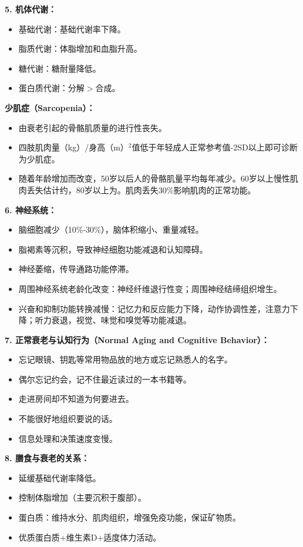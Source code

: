 \begin{defbox}
\textbf{5. 机体代谢：}
\begin{itemize}[leftmargin=*]
    \item 基础代谢：基础代谢率下降。
    \item 脂质代谢：体脂增加和血脂升高。
    \item 糖代谢：糖耐量降低。
    \item 蛋白质代谢：分解$>$合成。
\end{itemize}

\textbf{少肌症（Sarcopenia）：}
\begin{itemize}[leftmargin=*]
    \item 由衰老引起的骨骼肌质量的进行性丧失。
    \item 四肢肌肉量（kg）/身高（m）$^2$值低于年轻成人正常参考值-2SD以上即可诊断为少肌症。
    \item 随着年龄增加而改变，50岁以后人的骨骼肌量平均每年减少。60岁以上慢性肌肉丢失估计约，80岁以上为。肌肉丢失30\%影响肌肉的正常功能。
\end{itemize}

\textbf{6. 神经系统：}
\begin{itemize}[leftmargin=*]
    \item 脑细胞减少（10\%-30\%），脑体积缩小、重量减轻。
    \item 脂褐素等沉积，导致神经细胞功能减退和认知障碍。
    \item 神经萎缩，传导通路功能停滞。
    \item 周围神经系统老龄化改变：神经纤维退行性变；周围神经结缔组织增生。
    \item 兴奋和抑制功能转换减慢：记忆力和反应能力下降，动作协调性差，注意力下降；听力衰退，视觉、味觉和嗅觉等功能减退。
\end{itemize}

\textbf{7. 正常衰老与认知行为（Normal Aging and Cognitive Behavior）：}
\begin{itemize}[leftmargin=*]
    \item 忘记眼镜、钥匙等常用物品放的地方或忘记熟悉人的名字。
    \item 偶尔忘记约会，记不住最近读过的一本书籍等。
    \item 走进房间却不知道为何要进去。
    \item 不能很好地组织要说的话。
    \item 信息处理和决策速度变慢。
\end{itemize}

\textbf{8. 膳食与衰老的关系：}
\begin{itemize}[leftmargin=*]
    \item 延缓基础代谢率降低。
    \item 控制体脂增加（主要沉积于腹部）。
    \item 蛋白质：维持水分、肌肉组织，增强免疫功能，保证矿物质。
    \item 优质蛋白质+维生素D+适度体力活动。
\end{itemize}
\end{defbox}

